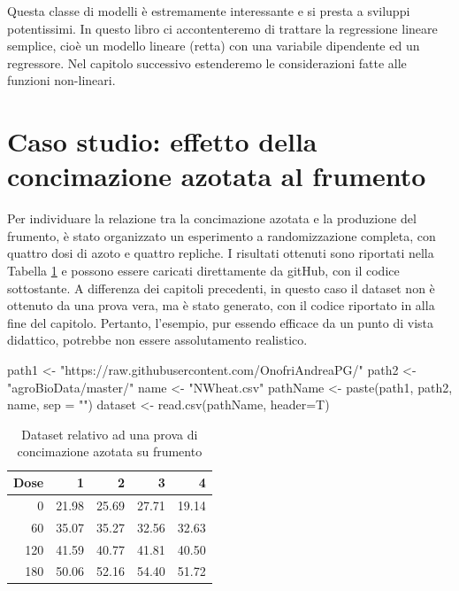 \documentclass[a4paper,12pt,oneside]{book}
\newenvironment{Shaded}{}{}
\newcommand{\KeywordTok}[1]{#1}
\newcommand{\DataTypeTok}[1]{#1}
\newcommand{\StringTok}[1]{#1}
\newcommand{\NormalTok}[1]{#1}
\begin{document}
Questa classe di modelli è estremamente interessante e si presta a sviluppi potentissimi. In questo libro ci accontenteremo di trattare la regressione lineare semplice, cioè un modello lineare (retta) con una variabile dipendente ed un regressore. Nel capitolo successivo estenderemo le considerazioni fatte alle funzioni non-lineari.

\hypertarget{caso-studio-effetto-della-concimazione-azotata-al-frumento}{%
\section{Caso studio: effetto della concimazione azotata al frumento}\label{caso-studio-effetto-della-concimazione-azotata-al-frumento}}

Per individuare la relazione tra la concimazione azotata e la produzione del frumento, è stato organizzato un esperimento a randomizzazione completa, con quattro dosi di azoto e quattro repliche. I risultati ottenuti sono riportati nella Tabella \ref{tab:tabName141} e possono essere caricati direttamente da gitHub, con il codice sottostante. A differenza dei capitoli precedenti, in questo caso il dataset non è ottenuto da una prova vera, ma è stato generato, con il codice riportato in alla fine del capitolo. Pertanto, l'esempio, pur essendo efficace da un punto di vista didattico, potrebbe non essere assolutamento realistico.

\begin{Shaded}
\begin{Highlighting}[]
\NormalTok{path1 <-}\StringTok{ "https://raw.githubusercontent.com/OnofriAndreaPG/"}
\NormalTok{path2 <-}\StringTok{ "agroBioData/master/"}
\NormalTok{name <-}\StringTok{ "NWheat.csv"}
\NormalTok{pathName <-}\StringTok{ }\KeywordTok{paste}\NormalTok{(path1, path2, name, }\DataTypeTok{sep =} \StringTok{""}\NormalTok{)}
\NormalTok{dataset <-}\StringTok{ }\KeywordTok{read.csv}\NormalTok{(pathName, }\DataTypeTok{header=}\NormalTok{T)}
\end{Highlighting}
\end{Shaded}

\begin{table}[t]

\caption{\label{tab:tabName141}Dataset relativo ad una prova di concimazione azotata su frumento}
\centering
\begin{tabular}{rrrrr}
\toprule
Dose & 1 & 2 & 3 & 4\\
\midrule
0 & 21.98 & 25.69 & 27.71 & 19.14\\
60 & 35.07 & 35.27 & 32.56 & 32.63\\
120 & 41.59 & 40.77 & 41.81 & 40.50\\
180 & 50.06 & 52.16 & 54.40 & 51.72\\
\bottomrule
\end{tabular}
\end{table}
\end{document}
